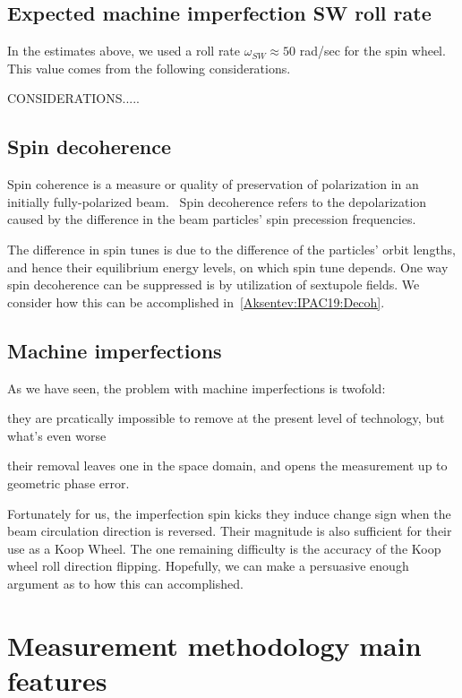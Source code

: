 \documentclass[a4paper]{jacow}
\newcommand{\w}{\omega}
\newcommand{\wsw}{\w_{SW}}
\begin{document}
\subsection{Expected machine imperfection SW roll rate}
In the estimates above, we used a roll rate $\wsw\approx 50$ rad/sec for the spin wheel. This value comes
from the following considerations.

CONSIDERATIONS.....

\subsection{Spin decoherence}
Spin coherence is a measure or quality of preservation of polarization in an initially fully-polarized
beam.~\cite{Eremey:Thesis} Spin decoherence refers to the depolarization caused by the difference in the
beam particles' spin precession frequencies. 

The difference in spin tunes is due to the difference of the particles' orbit lengths, and hence their
equilibrium energy levels, on which spin tune depends. One way spin decoherence can be suppressed is by
utilization of sextupole fields. We consider how this can be accomplished in~\ref{Aksentev:IPAC19:Decoh}.

\subsection{Machine imperfections}

As we have seen, the problem with machine imperfections is twofold:
\begin{inparaenum}
\item they are prcatically impossible to remove at the present level of technology, but what's even worse 
\item their removal leaves one in the space domain, and opens the measurement up to geometric phase error.
\end{inparaenum}

Fortunately for us, the imperfection spin kicks they induce change sign when the beam circulation direction
is reversed. Their magnitude is also sufficient for their use as a Koop Wheel. The one remaining difficulty
is the accuracy of the Koop wheel roll direction flipping. Hopefully, we can make a persuasive
enough argument as to how this can accomplished.

\section{Measurement methodology main features}
\end{document}
